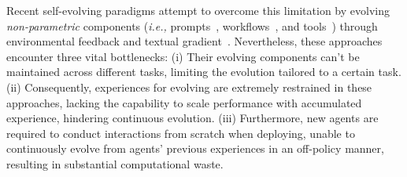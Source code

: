 Recent self-evolving paradigms attempt to overcome this limitation by evolving \textit{non-parametric} components (\textit{i.e.,} prompts~\cite{yuksekgonul2024textgrad,zhang2025agentic}, workflows~\cite{lin2025se,zhang2025multi,shang2024agentsquare}, and tools~\cite{qian2023creator,qiu2025alita}) through environmental feedback and textual gradient~\cite{yuksekgonul2024textgrad,shinn2023reflexion,zhang2024revolve}. 
Nevertheless, these approaches encounter three vital bottlenecks: 
(i) Their evolving components can't be maintained across different tasks, limiting the evolution tailored to a certain task.
(ii) Consequently, experiences for evolving are extremely restrained in these approaches, lacking the capability to scale performance with accumulated experience, hindering continuous evolution.
(iii) Furthermore, new agents are required to conduct interactions from scratch when deploying, unable to continuously evolve from agents' previous experiences in an off-policy manner, resulting in substantial computational waste.

